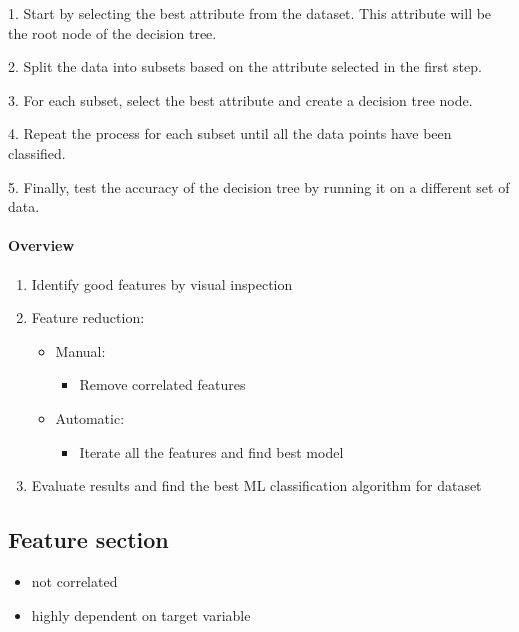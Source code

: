 1. Start by selecting the best attribute from the dataset. This attribute will be the root node of the decision 
tree. 

2. Split the data into subsets based on the attribute selected in the first step. 

3. For each subset, select the best attribute and create a decision tree node.

4. Repeat the process for each subset until all the data points have been classified.

5. Finally, test the accuracy of the decision tree by running it on a different set of data.
















\paragraph{Overview} 
\begin{enumerate}
    \item Identify good features by visual inspection 
    \item Feature reduction:
        \begin{itemize}
            \item Manual:
                \begin{itemize}
                    \item Remove correlated features
                \end{itemize}
                
            \item Automatic:
                \begin{itemize}
                    \item Iterate all the features and find best model 
                \end{itemize}
                
        \end{itemize}
        
    \item Evaluate results and find the best ML classification algorithm for dataset 
    
\end{enumerate}


\subsection{Feature section}
\begin{itemize}
    \item not correlated
    \item highly dependent on target variable 
\end{itemize}




